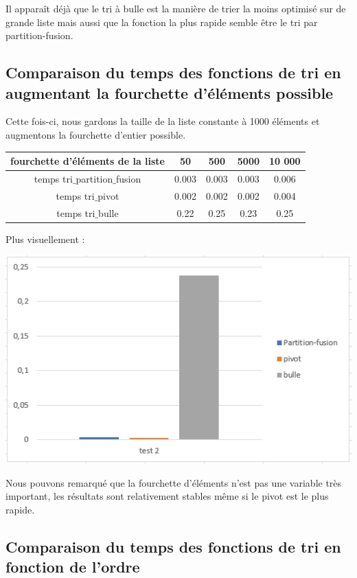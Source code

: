 \documentclass[a4paper, 12pt]{article}
\begin{document}
Il apparaît déjà que le tri à bulle est la manière de trier la moins optimisé sur de grande liste mais aussi que la fonction la plus rapide semble être le tri par partition-fusion.

\subsection{Comparaison du temps des fonctions de tri en augmentant la fourchette d'éléments possible}

Cette fois-ci, nous gardons la taille de la liste constante à 1000 éléments et augmentons la fourchette d'entier possible. 
\begin{center}
\begin{tabular}{|c|c|c|c|c|}
\hline 
fourchette d'éléments de la liste & 50 & 500 & 5000 & 10 000 \\ 
\hline 
temps tri$\_$partition$\_$fusion & 0.003 & 0.003 & 0.003& 0.006 \\ 
\hline 
temps tri$\_$pivot & 0.002 & 0.002 & 0.002 & 0.004\\ 
\hline 
temps tri$\_$bulle & 0.22 & 0.25 & 0.23 & 0.25 \\ 
\hline 
\end{tabular} 
\end{center}

Plus visuellement : 
\begin{center}
\includegraphics[scale=1]{graphique/test2.PNG} 
\end{center}

Nous pouvons remarqué que la fourchette d'éléments n'est pas une variable très important, les résultats sont relativement stables même si le pivot est le plus rapide.

\subsection{Comparaison du temps des fonctions de tri en fonction de l'ordre} 
\end{document}
